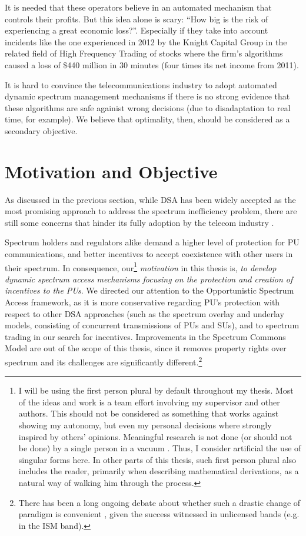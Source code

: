 It is needed that these operators believe in an automated mechanism that controls their profits. But this idea alone is scary: \enquote{How big is the risk of experiencing a great economic loss?}. Especially if they take into account incidents like the one experienced in 2012 by the Knight Capital Group in the related
field of High Frequency Trading of stocks \cite{web:Silver2012} where the firm's algorithms caused a loss of \$440 million in 30 minutes (four times its net income from 2011).

It is hard to convince the telecommunications industry to adopt automated dynamic spectrum management mechanisms if there is no strong evidence that these algorithms are safe againist wrong decisions (due to disadaptation to real time, for example). We believe that optimality, then, should be considered as a secondary objective.

\section{Motivation and Objective}

As discussed in the previous section, while DSA has been widely accepted as the most promising approach to address the spectrum inefficiency problem, there are still some concerns that hinder its fully adoption by the telecom industry \cite{ref:Kelly2012}.

Spectrum holders and regulators alike demand a higher level of protection for PU communications, and better incentives to accept coexistence with other users in their spectrum. In consequence, our\footnote{I will be using the first person plural by default throughout my thesis. Most of the ideas and work is a team effort involving my supervisor and other authors. This should not be considered as something that works against showing my autonomy, but even my personal decisions where strongly inspired by others' opinions. Meaningful research is not done (or should not be done) by a single person in a vacuum \cite{ref:Mihaly2013}. Thus, I consider artificial the use of singular forms here. In other parts of this thesis, such first person plural also includes the reader, primarily when describing mathematical derivations, as a natural way of walking him through the process.} \emph{motivation} in this thesis is, \emph{to develop dynamic spectrum access mechanisms focusing on the protection and creation of incentives to the PUs}. We directed our attention to the Opportunistic Spectrum Access framework, as it is more conservative regarding PU's protection with respect to other DSA approaches (such as the spectrum overlay and underlay models, consisting of concurrent transmissions of PUs and SUs), and to spectrum trading in our search for incentives.
Improvements in the Spectrum Commons Model are out of the scope of this thesis, since it removes property rights over spectrum and its challenges are significantly different.\footnote{There has been a long ongoing debate about whether such a drastic change of paradigm is convenient \cite{ref:Peha2005}, given the success witnessed in unlicensed bands (e.g. in the ISM band).}

